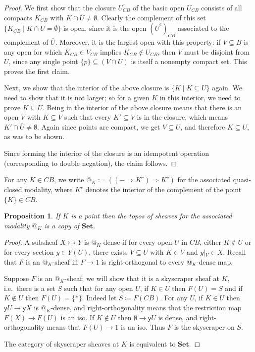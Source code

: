 \documentclass[11pt, oneside, article]{memoir}
\makeatletter
\theoremstyle{plain}
\newtheorem{proposition}[theorem]{Proposition}
\theoremstyle{definition}
\theoremstyle{remark}
\renewcommand{\ss}{\subseteq}
\newcommand{\Cat}[1]{\mathbf{#1}}
\newcommand{\Fun}[1]{\mathsf{#1}}
\newcommand{\smset}{\Cat{Set}}
\newcommand{\inj}{\rightarrowtail}
\newcommand{\ol}[1]{\overline{#1}}
\newcommand{\yoneda}{\Fun{y}}
\newcommand{\restrict}[2]{#1\big|\hspace{0in}_{#2}}
\newcommand{\BaseSpace}{B}
\newcommand{\CB}{C\BaseSpace}
\newcommand{\AtSymbol}{{@}}
\newcommand{\At}[2][]{\AtSymbol^{#1}_{#2}}
\newcommand{\imp}{\Rightarrow}
\makeatother
\begin{document}
\begin{proof}
We first show that the closure $\ol{U_{C\BaseSpace}}$ of the basic open $U_{C\BaseSpace}$ consists of all compacts $K_{C\BaseSpace}$ with $K\cap\overline{U} \neq \emptyset$. Clearly the complement of this set $\{K_{C\BaseSpace}\mid K\cap\ol{U}=\emptyset\}$ is open, since it is the open $(\ol{U}^c)_{C\BaseSpace}$ associated to the complement of $\overline{U}$. Moreover, it is the largest open with this property: if $V\subseteq B$ is any open for which $K_{C\BaseSpace}\in V_{C\BaseSpace}$ implies $K_{C\BaseSpace} \not\in U_{C\BaseSpace}$, then $V$ must be disjoint from $U$, since any single point $\{p\}\ss(V\cap U)$ is itself a nonempty compact set. This proves the first claim.

Next, we show that the interior of the above closure is $\{ K \mid K\subseteq U\}$ again. We need to show that it is not larger; so for a given $K$ in this interior, we need to prove $K\subseteq U$. Being in the interior of the above closure means that there is an open $V$ with $K\subseteq V$ such that every $K' \subseteq V$ is in the closure, which means $K' \cap \overline{U} \neq \emptyset$. Again since points are compact, we get $V \subseteq U$, and therefore $K \subseteq U$, as was to be shown.

Since forming the interior of the closure is an idempotent operation (corresponding to double negation), the claim follows.
\end{proof}

For any $K\in CB$, we write $\At{K} := ((- \imp K^c) \imp K^c)$ for the associated quasi-closed modality, where $K^c$ denotes the interior of the complement of the point $\{K\}\in\CB$. 

\begin{proposition}
If $K$ is a point then the topos of sheaves for the associated modality $\At{K}$ is a copy of $\smset$.
\end{proposition}
\begin{proof}
A subsheaf $X\inj Y$ is $\At{K}$-dense if for every open $U$ in $C\BaseSpace$, either $K\not\in U$ or for every section $y\in Y(U)$, there exists $V\ss U$ with $K\in V$ and $\restrict{y}{V}\in X$. Recall that $F$ is an $\At{K}$-sheaf iff $F\to 1$ is right-orthogonal to every $\At{K}$-dense map.

Suppose $F$ is an $\At{K}$-sheaf; we will show that it is a skyscraper sheaf at $K$, i.e.\ there is a set $S$ such that for any open $U$, if $K\in U$ then $F(U)=S$ and if $K\not\in U$ then $F(U)=\{*\}$. Indeed let $S\coloneqq F(C\BaseSpace)$. For any $U$, if $K\in U$ then $\yoneda U\to\yoneda X$ is $\At{K}$-dense, and right-orthogonality means that the restriction map $F(X)\to F(U)$ is an iso. If $K\not\in U$ then $\emptyset\to\yoneda U$ is dense, and right-orthogonality means that $F(U)\to 1$ is an iso. Thus $F$ is the skyscraper on $S$.

The category of skyscraper sheaves at $K$ is equivalent to $\smset$.
\end{proof}
\end{document}
